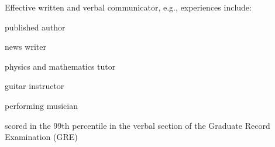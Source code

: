 \noindent Effective written and verbal communicator, e.g.,
experiences include:
\vspace{-0.3cm}
\begin{itemize*}
  \item published author
  \item news writer 
  \item physics and mathematics tutor
  \item guitar instructor 
  \item performing musician
  \item scored in the 99th percentile in the verbal section of the
    Graduate Record Examination (GRE)
\end{itemize*}
